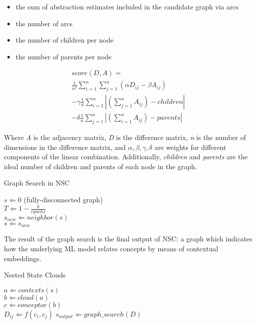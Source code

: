\begin{itemize}
    \item the sum of abstraction estimates included in the candidate graph via arcs
    \item the number of arcs
    \item the number of children per node
    \item the number of parents per node
\end{itemize}

\begin{align*}
    score(D, A) = \\
        \frac{1}{n^2} \sum_{i=1}^{n} \sum_{j=1}^{n} (\alpha D_{ij} - \beta A_{ij}) \\
    - \gamma \frac{1}{n} \sum_{i=1}^{n} \left|(\sum_{j=1}^{n}A_{ij}) - children\right| \\
    - \delta \frac{1}{n} \sum_{j=1}^{n} \left|(\sum_{i=1}^{n}A_{ij}) - parents\right|
\end{align*}

Where \textit{A} is the adjacency matrix, \textit{D} is the difference matrix, \textit{n} is the number of dimensions in the difference matrix, and $\alpha, \beta, \gamma, \delta$ are weights for different components of the linear combination. Additionally, \textit{children} and \textit{parents} are the ideal number of children and parents of each node in the graph.

\begin{algorithm}[!tbp] 
    \caption{Graph Search in NSC}
    \label{alg:gs}
    \begin{algorithmic}
        \STATE $s \Leftarrow 0 $ (fully-disconnected graph) \\
        \STATE $T \Leftarrow 1 - \frac{k}{epochs}$ \\
        \STATE $s_{new} \Leftarrow neighbor(s)$ \\
            \STATE $s \Leftarrow s_{new}$
        \ENDIF
        \ENDFOR
    \end{algorithmic}
\end{algorithm}

The result of the graph search is the final output of NSC: a graph which indicates how the underlying ML model relates concepts by means of contextual embeddings.

\begin{algorithm}[!tbp] 
    \caption{Nested State Clouds}
    \label{alg:gs}
    \begin{algorithmic}
            \STATE $a \Leftarrow contexts(s)$ \\
            \STATE $b \Leftarrow cloud(a)$ \\
            \STATE $c \Leftarrow conceptor(b)$ \\
        \ENDFOR
                \STATE $D_{ij} \Leftarrow f(c_i, c_j)$
            \ENDFOR
        \ENDFOR
        \STATE $s_{output} \Leftarrow graph\_search(D)$
    \end{algorithmic}
\end{algorithm}